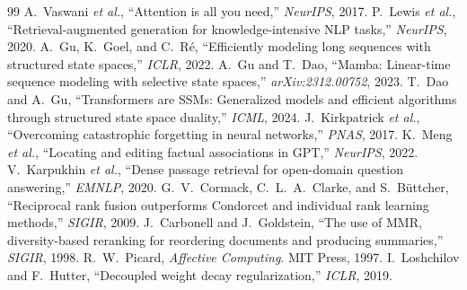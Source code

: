 \documentclass[journal,onecolumn,11pt]{IEEEtran}
\begin{document}
\begin{thebibliography}{99}
 A.~Vaswani \emph{et al.}, ``Attention is all you need,''
\emph{NeurIPS}, 2017.
 P.~Lewis \emph{et al.}, ``Retrieval-augmented generation for
knowledge-intensive NLP tasks,'' \emph{NeurIPS}, 2020.
 A.~Gu, K.~Goel, and C.~R\'e, ``Efficiently modeling long
sequences with structured state spaces,'' \emph{ICLR}, 2022.
 A.~Gu and T.~Dao, ``Mamba: Linear-time sequence modeling
with selective state spaces,'' \emph{arXiv:2312.00752}, 2023.
 T.~Dao and A.~Gu, ``Transformers are SSMs: Generalized
models and efficient algorithms through structured state space duality,''
\emph{ICML}, 2024.
 J.~Kirkpatrick \emph{et al.}, ``Overcoming
catastrophic forgetting in neural networks,'' \emph{PNAS}, 2017.
 K.~Meng \emph{et al.}, ``Locating and editing factual
associations in GPT,'' \emph{NeurIPS}, 2022.
 V.~Karpukhin \emph{et al.}, ``Dense passage retrieval
for open-domain question answering,'' \emph{EMNLP}, 2020.
 G.~V.~Cormack, C.~L.~A.~Clarke, and S.~B\"uttcher,
``Reciprocal rank fusion outperforms Condorcet and individual rank learning
methods,'' \emph{SIGIR}, 2009.
 J.~Carbonell and J.~Goldstein, ``The use of MMR,
diversity-based reranking for reordering documents and producing summaries,''
\emph{SIGIR}, 1998.
 R.~W.~Picard, \emph{Affective Computing}. MIT
Press, 1997.
 I.~Loshchilov and F.~Hutter, ``Decoupled weight
decay regularization,'' \emph{ICLR}, 2019.
\end{thebibliography}
\end{document}
